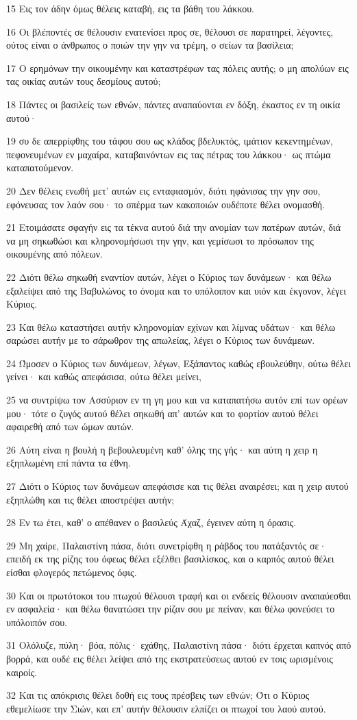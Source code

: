 \par 15 Εις τον άδην όμως θέλεις καταβή, εις τα βάθη του λάκκου.
\par 16 Οι βλέποντές σε θέλουσιν ενατενίσει προς σε, θέλουσι σε παρατηρεί, λέγοντες, ούτος είναι ο άνθρωπος ο ποιών την γην να τρέμη, ο σείων τα βασίλεια;
\par 17 Ο ερημόνων την οικουμένην και καταστρέφων τας πόλεις αυτής; ο μη απολύων εις τας οικίας αυτών τους δεσμίους αυτού;
\par 18 Πάντες οι βασιλείς των εθνών, πάντες αναπαύονται εν δόξη, έκαστος εν τη οικία αυτού·
\par 19 συ δε απερρίφθης του τάφου σου ως κλάδος βδελυκτός, ιμάτιον κεκεντημένων, πεφονευμένων εν μαχαίρα, καταβαινόντων εις τας πέτρας του λάκκου· ως πτώμα καταπατούμενον.
\par 20 Δεν θέλεις ενωθή μετ' αυτών εις ενταφιασμόν, διότι ηφάνισας την γην σου, εφόνευσας τον λαόν σου· το σπέρμα των κακοποιών ουδέποτε θέλει ονομασθή.
\par 21 Ετοιμάσατε σφαγήν εις τα τέκνα αυτού διά την ανομίαν των πατέρων αυτών, διά να μη σηκωθώσι και κληρονομήσωσι την γην, και γεμίσωσι το πρόσωπον της οικουμένης από πόλεων.
\par 22 Διότι θέλω σηκωθή εναντίον αυτών, λέγει ο Κύριος των δυνάμεων· και θέλω εξαλείψει από της Βαβυλώνος το όνομα και το υπόλοιπον και υιόν και έκγονον, λέγει Κύριος.
\par 23 Και θέλω καταστήσει αυτήν κληρονομίαν εχίνων και λίμνας υδάτων· και θέλω σαρώσει αυτήν με το σάρωθρον της απωλείας, λέγει ο Κύριος των δυνάμεων.
\par 24 Ώμοσεν ο Κύριος των δυνάμεων, λέγων, Εξάπαντος καθώς εβουλεύθην, ούτω θέλει γείνει· και καθώς απεφάσισα, ούτω θέλει μείνει,
\par 25 να συντρίψω τον Ασσύριον εν τη γη μου και να καταπατήσω αυτόν επί των ορέων μου· τότε ο ζυγός αυτού θέλει σηκωθή απ' αυτών και το φορτίον αυτού θέλει αφαιρεθή από των ώμων αυτών.
\par 26 Αύτη είναι η βουλή η βεβουλευμένη καθ' όλης της γής· και αύτη η χειρ η εξηπλωμένη επί πάντα τα έθνη.
\par 27 Διότι ο Κύριος των δυνάμεων απεφάσισε και τις θέλει αναιρέσει; και η χειρ αυτού εξηπλώθη και τις θέλει αποστρέψει αυτήν;
\par 28 Εν τω έτει, καθ' ο απέθανεν ο βασιλεύς Άχαζ, έγεινεν αύτη η όρασις.
\par 29 Μη χαίρε, Παλαιστίνη πάσα, διότι συνετρίφθη η ράβδος του πατάξαντός σε· επειδή εκ της ρίζης του όφεως θέλει εξέλθει βασιλίσκος, και ο καρπός αυτού θέλει είσθαι φλογερός πετώμενος όφις.
\par 30 Και οι πρωτότοκοι του πτωχού θέλουσι τραφή και οι ενδεείς θέλουσιν αναπαύεσθαι εν ασφαλεία· και θέλω θανατώσει την ρίζαν σου με πείναν, και θέλω φονεύσει το υπόλοιπόν σου.
\par 31 Ολόλυζε, πύλη· βόα, πόλις· εχάθης, Παλαιστίνη πάσα· διότι έρχεται καπνός από βορρά, και ουδέ εις θέλει λείψει από της εκστρατεύσεως αυτού εν τοις ωρισμένοις καιροίς.
\par 32 Και τις απόκρισις θέλει δοθή εις τους πρέσβεις των εθνών; Ότι ο Κύριος εθεμελίωσε την Σιών, και επ' αυτήν θέλουσιν ελπίζει οι πτωχοί του λαού αυτού.

